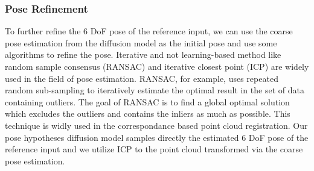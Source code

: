 \documentclass[12pt,DIV14,BCOR12mm,a4paper,footinclude=false,headinclude,parskip=half-,twoside,openright,cleardoublepage=empty,toc=index,bibliography=totoc,listof=totoc]{scrreprt}
\numberwithin{equation}{chapter}
\begin{document}
\subsubsection{Pose Refinement}
To further refine the 6 DoF pose of the reference input, we can use the coarse pose estimation from the diffusion model as the initial pose and use some algorithms to refine the pose. Iterative and not learning-based method like random sample consensus (RANSAC)\cite{10.1145/358669.358692} and iterative closest point (ICP)\cite{121791} are widely used in the field of pose estimation. RANSAC, for example, uses repeated random sub-sampling to iteratively estimate the optimal result in the set of data containing outliers. The goal of RANSAC is to find a global optimal solution which excludes the outliers and contains the inliers as much as possible. This technique is widly used in the correspondance based point cloud registration. Our pose hypotheses diffusion model samples directly the estimated 6 DoF pose of the reference input and we utilize ICP to the point cloud transformed via the coarse pose estimation. 
\end{document}
